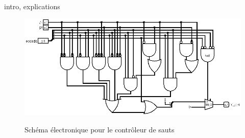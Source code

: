 \paragraph{}{
	intro, explications
}

\begin{figure}
	\centering
	\includegraphics[scale=0.5,origin=c]{circuits/control_saut.png}
	\label{control_saut_circ}
	\caption{Sch\'{e}ma \'{e}lectronique pour le contr\^{o}leur de sauts}
\end{figure}